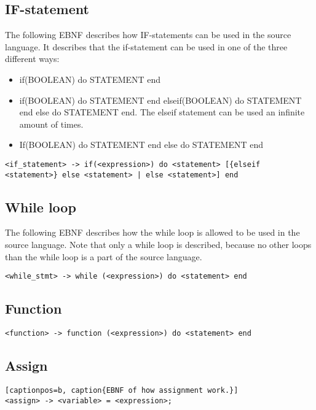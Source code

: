 \subsection{IF-statement}
The following EBNF describes how IF-statements can be used in the source language. It describes that the if-statement can be used in one of the three different ways:
\begin{itemize}
	\item if(BOOLEAN) do STATEMENT end
	\item if(BOOLEAN) do STATEMENT end elseif(BOOLEAN) do STATEMENT end else do STATEMENT end. The elseif statement can be used an infinite amount of times.
	\item If(BOOLEAN) do STATEMENT end else do STATEMENT end
\end{itemize}
\begin{lstlisting}[captionpos=b, caption={EBNF of the IF-statement in the source language}]
<if_statement> -> if(<expression>) do <statement> [{elseif <statement>} else <statement> | else <statement>] end
\end{lstlisting}


\subsection{While loop}
The following EBNF describes how the while loop is allowed to be used in the source language. Note that only a while loop is described, because no other loops than the while loop is a part of the source language.
\begin{lstlisting}[captionpos=b, caption={EBNF of a while loop.}]
<while_stmt> -> while (<expression>) do <statement> end
\end{lstlisting}

\subsection{Function}
\begin{lstlisting}[captionpos=b, caption={EBNF of a function.}]
<function> -> function (<expression>) do <statement> end
\end{lstlisting}

\subsection{Assign}
\begin{lstlisting}[captionpos=b, caption{EBNF of how assignment work.}]
<assign> -> <variable> = <expression>;
\end{lstlisting}

